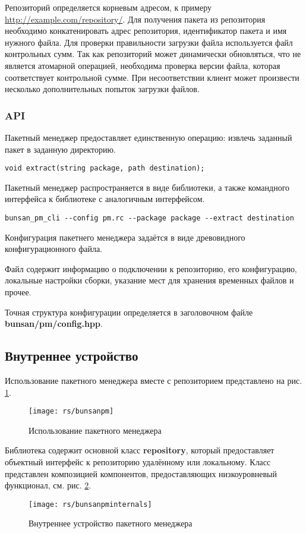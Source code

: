 Репозиторий определяется корневым адресом, к примеру \url{http://example.com/repository/}.
Для получения пакета из репозитория необходимо конкатенировать адрес репозитория,
идентификатор пакета и имя нужного файла. Для проверки правильности загрузки файла
используется файл контрольных сумм. Так как репозиторий может динамически обновляться,
что не является атомарной операцией, необходима проверка версии файла, которая соответствует
контрольной сумме. При несоответствии клиент может произвести несколько дополнительных
попыток загрузки файлов.

\subsubsection{API}
Пакетный менеджер предоставляет единственную операцию:
извлечь заданный пакет в заданную директорию.

\begin{verbatim}
void extract(string package, path destination);
\end{verbatim}

Пакетный менеджер распространяется в виде библиотеки,
а также командного интерфейса к библиотеке с аналогичным интерфейсом.

\begin{verbatim}
bunsan_pm_cli --config pm.rc --package package --extract destination
\end{verbatim}

Конфигурация пакетнего менеджера задаётся в виде древовидного
конфигурационного файла.

Файл содержит информацию о подключении к репозиторию, его конфигурацию,
локальные настройки сборки, указание мест для хранения временных файлов и прочее.

Точная структура конфигурации определяется в заголовочном файле
\textbf{bunsan/pm/config.hpp}.

\subsection{Внутреннее устройство}
Использование пакетного менеджера вместе с репозиторием представлено на рис. \ref{fig:bunsanpm}.

\begin{figure}
    \texttt{[image: rs/bunsanpm]}
    \caption{Использование пакетного менеджера}
    \label{fig:bunsanpm}
\end{figure}

Библиотека содержит основной класс \textbf{repository}, который предоставляет
объектный интерфейс к репозиторию удалённому или локальному.
Класс представлен композицией компонентов, предоставляющих низкоуровневый функционал,
см. рис. \ref{fig:bunsanpminternals}.

\begin{figure}
    \texttt{[image: rs/bunsanpminternals]}
    \caption{Внутреннее устройство пакетного менеджера}
    \label{fig:bunsanpminternals}
\end{figure}